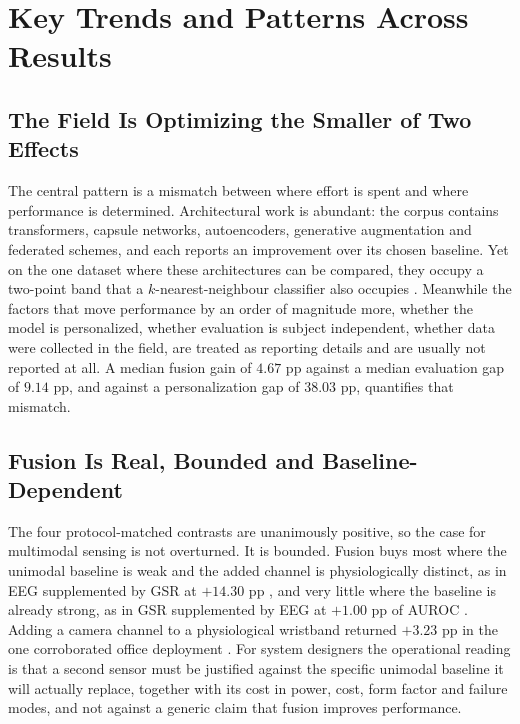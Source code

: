 \documentclass[11pt,a4paper]{article}
\begin{document}
\section{Key Trends and Patterns Across Results}

\subsection{The Field Is Optimizing the Smaller of Two Effects}
The central pattern is a mismatch between where effort is spent and where performance is
determined. Architectural work is abundant: the corpus contains transformers, capsule
networks, autoencoders, generative augmentation and federated schemes, and each reports an
improvement over its chosen baseline. Yet on the one dataset where these architectures can be
compared, they occupy a two-point band that a $k$-nearest-neighbour classifier also occupies
\cite{r14,r50}. Meanwhile the factors that move performance by an order of magnitude more,
whether the model is personalized, whether evaluation is subject independent, whether data
were collected in the field, are treated as reporting details and are usually not reported at
all. A median fusion gain of $4.67$ pp against a median evaluation gap of $9.14$ pp, and
against a personalization gap of $38.03$ pp, quantifies that mismatch.

\subsection{Fusion Is Real, Bounded and Baseline-Dependent}
The four protocol-matched contrasts are unanimously positive, so the case for multimodal
sensing is not overturned. It is bounded. Fusion buys most where the unimodal baseline is
weak and the added channel is physiologically distinct, as in EEG supplemented by GSR at
$+14.30$ pp \cite{r75}, and very little where the baseline is already strong, as in GSR
supplemented by EEG at $+1.00$ pp of AUROC \cite{r37}. Adding a camera channel to a
physiological wristband returned $+3.23$ pp in the one corroborated office deployment
\cite{r26}. For system designers the operational reading is that a second sensor must be
justified against the specific unimodal baseline it will actually replace, together with its
cost in power, cost, form factor and failure modes, and not against a generic claim that
fusion improves performance.
\end{document}
